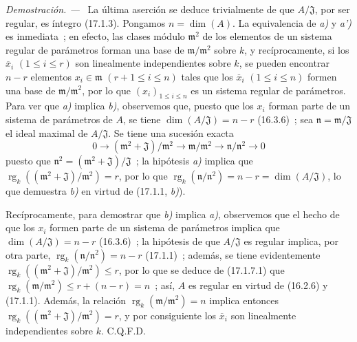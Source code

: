 \documentclass[10pt,oneside]{book}
\newenvironment{proof}{%
  \par\medskip\noindent\textit{Demostración. ---\ }}{\par}
\begin{document}
\begin{proof}
La última aserción se deduce trivialmente de que $A/\mathfrak{J}$,
por ser regular, es íntegro (17.1.3). Pongamos $n=\dim(A)$. La equivalencia de \emph{a)}
y \emph{a')} es inmediata~; en efecto, las clases módulo $\mathfrak{m}^2$ de los elementos
de un sistema regular de parámetros forman una base de
$\mathfrak{m}/\mathfrak{m}^2$ sobre $k$, y recíprocamente, si los
$\overline{x}_i$ $(1\leq i\leq r)$ son linealmente independientes sobre $k$, se
pueden encontrar $n-r$ elementos $x_i\in\mathfrak{m}$ $(r+1\leq i\leq n)$ tales que
los $\overline{x}_i$ $(1\leq i\leq n)$ formen una base de
$\mathfrak{m}/\mathfrak{m}^2$, por lo que $(x_i)_{1\leq i\leq n}$ es un sistema
regular de parámetros. Para ver que \emph{a)} implica \emph{b)}, observemos que, puesto que
los $x_i$ forman parte de un sistema de parámetros de $A$, se tiene
$\dim(A/\mathfrak{J})=n-r$ (16.3.6)~; sea
$\mathfrak{n}=\mathfrak{m}/\mathfrak{J}$ el ideal maximal de
$A/\mathfrak{J}$. Se tiene una sucesión exacta
\begin{equation}
\label{0.17.1.7.1-es}
\tag{17.1.7.1}
  0\longrightarrow(\mathfrak{m}^2+\mathfrak{J})/\mathfrak{m}^2
  \longrightarrow\mathfrak{m}/\mathfrak{m}^2
  \longrightarrow\mathfrak{n}/\mathfrak{n}^2\longrightarrow0
\end{equation}
puesto que $\mathfrak{n}^2=(\mathfrak{m}^2+\mathfrak{J})/\mathfrak{J}$~;
la hipótesis \emph{a)} implica que
$\operatorname{rg}_k((\mathfrak{m}^2+\mathfrak{J})/\mathfrak{m}^2)=r$, por lo que
$\operatorname{rg}_k(\mathfrak{n}/\mathfrak{n}^2)=n-r
=\dim(A/\mathfrak{J})$, lo que demuestra \emph{b)} en virtud de (17.1.1, \emph{b)}).

Recíprocamente, para demostrar que \emph{b)} implica \emph{a)}, observemos que el hecho de que los $x_i$
formen parte de un sistema de parámetros implica que
$\dim(A/\mathfrak{J})=n-r$ (16.3.6)~; la hipótesis de que $A/\mathfrak{J}$ es
regular implica, por otra parte,
$\operatorname{rg}_k(\mathfrak{n}/\mathfrak{n}^2)=n-r$ (17.1.1)~; además,
se tiene evidentemente
$\operatorname{rg}_k((\mathfrak{m}^2+\mathfrak{J})/\mathfrak{m}^2)\leq r$,
por lo que se deduce de (17.1.7.1) que
$\operatorname{rg}_k(\mathfrak{m}/\mathfrak{m}^2)\leq r+(n-r)=n$~; así, $A$
es regular en virtud de (16.2.6) y (17.1.1). Además, la relación
$\operatorname{rg}_k(\mathfrak{m}/\mathfrak{m}^2)=n$ implica entonces
$\operatorname{rg}_k((\mathfrak{m}^2+\mathfrak{J})/\mathfrak{m}^2)=r$, y por
consiguiente los $\overline{x}_i$ son linealmente independientes sobre $k$. C.Q.F.D.
\end{proof}
\end{document}

